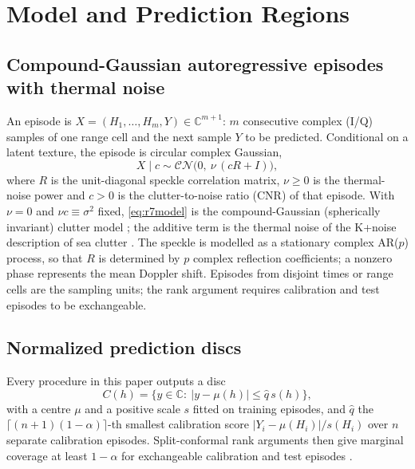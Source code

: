 
\section{Model and Prediction Regions}
\subsection{Compound-Gaussian autoregressive episodes with thermal noise}
An episode is $X=(H_1,\dots,H_m,Y)\in\mathbb{C}^{m+1}$: $m$ consecutive complex (I/Q) samples of one range cell and the next sample $Y$ to be predicted. Conditional on a latent texture, the episode is circular complex Gaussian,
\begin{equation}
X\mid c\sim\mathcal{CN}\big(0,\ \nu\,(cR+I)\big),
\label{eq:r7model}
\end{equation}
where $R$ is the unit-diagonal speckle correlation matrix, $\nu\ge0$ is the thermal-noise power and $c>0$ is the clutter-to-noise ratio (CNR) of that episode. With $\nu=0$ and $\nu c\equiv\sigma^2$ fixed, \eqref{eq:r7model} is the compound-Gaussian (spherically invariant) clutter model \cite{conte1995,ollila2012}; the additive term is the thermal noise of the K+noise description of sea clutter \cite{watts1987,ward2013}. The speckle is modelled as a stationary complex AR($p$) process, so that $R$ is determined by $p$ complex reflection coefficients; a nonzero phase represents the mean Doppler shift. Episodes from disjoint times or range cells are the sampling units; the rank argument requires calibration and test episodes to be exchangeable.

\subsection{Normalized prediction discs}
Every procedure in this paper outputs a disc
\begin{equation}
C(h)=\{y\in\mathbb C:\ |y-\mu(h)|\le \widehat q\,s(h)\},
\label{eq:disc}
\end{equation}
with a centre $\mu$ and a positive scale $s$ fitted on training episodes, and $\widehat q$ the $\lceil(n+1)(1-\alpha)\rceil$-th smallest calibration score $|Y_i-\mu(H_i)|/s(H_i)$ over $n$ separate calibration episodes. Split-conformal rank arguments then give marginal coverage at least $1-\alpha$ for exchangeable calibration and test episodes \cite{lei2018}.

